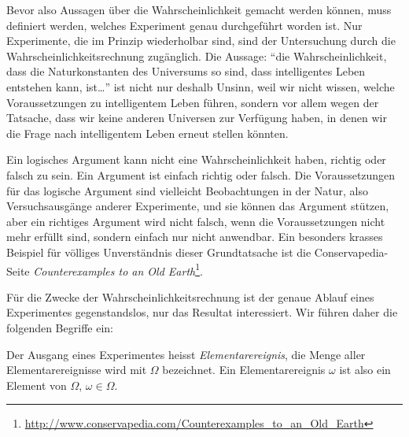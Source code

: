 Bevor also Aussagen über die Wahrscheinlichkeit gemacht werden können,
muss definiert werden, welches Experiment genau durchgeführt worden ist.
Nur Experimente, die im Prinzip wiederholbar sind, sind der Untersuchung
durch die Wahrscheinlichkeitsrechnung zugänglich.
Die Aussage: ``die Wahrscheinlichkeit, dass die Naturkonstanten des
Universums so sind, dass intelligentes Leben entstehen kann, ist\dots''
ist nicht nur deshalb Unsinn, weil wir nicht wissen, welche
Voraussetzungen zu intelligentem Leben führen, sondern vor allem wegen
der Tatsache, dass wir keine anderen Universen zur Verfügung haben, in denen
wir die Frage nach intelligentem Leben erneut stellen könnten.

Ein logisches Argument kann nicht eine Wahrscheinlichkeit haben,
richtig oder falsch zu sein.
Ein Argument ist einfach richtig oder falsch.
Die Voraussetzungen für das logische Argument sind vielleicht Beobachtungen
in der Natur, also Versuchsausgänge anderer Experimente, und sie
können das Argument stützen, aber ein richtiges Argument wird nicht
falsch, wenn die Voraussetzungen nicht mehr erfüllt sind, sondern einfach
nur nicht anwendbar.
Ein besonders krasses Beispiel für völliges Unverständnis
dieser Grundtatsache ist die Conservapedia-Seite {\em Counterexamples
to an Old Earth}\footnote{\url{http://www.conservapedia.com/Counterexamples\_to\_an\_Old\_Earth}}.

Für die Zwecke der Wahrscheinlichkeitsrechnung ist der genaue Ablauf
eines Experimentes gegenstandslos, nur das Resultat interessiert.
Wir führen daher die folgenden Begriffe ein:

\begin{definition}
Der Ausgang eines Experimentes heisst {\em Elementarereignis}, die
Menge aller Elementarereignisse wird mit $\Omega$ bezeichnet.
Ein Elementarereignis $\omega$ ist also ein Element von $\Omega$,
$\omega\in\Omega$.
\end{definition}

